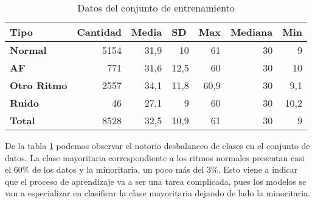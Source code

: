        
        \begin{table}[htbp]
        \caption{Datos del conjunto de entrenamiento}
        \begin{center}
        \begin{tabular}{|l|r|r|r|r|r|r|}
        \hline
        \textbf{Tipo} & \multicolumn{1}{l|}{\textbf{Cantidad}} & \multicolumn{1}{l|}{\textbf{Media}} & \multicolumn{1}{l|}{\textbf{SD}} & \multicolumn{1}{l|}{\textbf{Max}} & \multicolumn{1}{l|}{\textbf{Mediana}} & \multicolumn{1}{l|}{\textbf{Min}} \\ \hline
        \textbf{Normal} & 5154 & 31,9 & 10 & 61 & 30 & 9 \\ \hline
        \textbf{AF} & 771 & 31,6 & 12,5 & 60 & 30 & 10 \\ \hline
        \textbf{Otro Ritmo} & 2557 & 34,1 & 11,8 & 60,9 & 30 & 9,1 \\ \hline
        \textbf{Ruido} & 46 & 27,1 & 9 & 60 & 30 & 10,2 \\ \hline
        \textbf{Total} & 8528 & 32,5 & 10,9 & 61 & 30 & 9 \\ \hline
        \end{tabular}
        \end{center}
        \label{table:BD}
        \end{table}
        
        De la tabla \ref{table:BD} podemos observar el notorio desbalanceo de clases en el conjunto de datos. La clase mayoritaria correspondiente a los ritmos normales presentan casi el $60\%$ de los datos y la minoritaria, un poco más del $3\%$. Esto viene a indicar que el proceso de aprendizaje va a ser una tarea complicada, pues los modelos se van a especializar en clasificar la clase mayoritaria dejando de lado la minoritaria. \\
        
